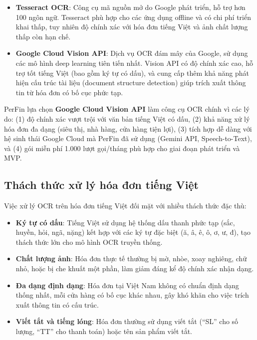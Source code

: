 \begin{itemize}
    \item \textbf{Tesseract OCR}: Công cụ mã nguồn mở do Google phát triển, hỗ trợ hơn 100 ngôn ngữ. Tesseract phù hợp cho các ứng dụng offline và có chi phí triển khai thấp, tuy nhiên độ chính xác với hóa đơn tiếng Việt và ảnh chất lượng thấp còn hạn chế.

    \item \textbf{Google Cloud Vision API}: Dịch vụ OCR đám mây của Google, sử dụng các mô hình deep learning tiên tiến nhất. Vision API có độ chính xác cao, hỗ trợ tốt tiếng Việt (bao gồm ký tự có dấu), và cung cấp thêm khả năng phát hiện cấu trúc tài liệu (document structure detection) giúp trích xuất thông tin từ hóa đơn có bố cục phức tạp.
\end{itemize}

PerFin lựa chọn \textbf{Google Cloud Vision API} làm công cụ OCR chính vì các lý do: (1) độ chính xác vượt trội với văn bản tiếng Việt có dấu, (2) khả năng xử lý hóa đơn đa dạng (siêu thị, nhà hàng, cửa hàng tiện lợi), (3) tích hợp dễ dàng với hệ sinh thái Google Cloud mà PerFin đã sử dụng (Gemini API, Speech-to-Text), và (4) gói miễn phí 1.000 lượt gọi/tháng phù hợp cho giai đoạn phát triển và MVP.

\subsection{Thách thức xử lý hóa đơn tiếng Việt}
\label{subsec:ocr_vietnamese_challenges}

Việc xử lý OCR trên hóa đơn tiếng Việt đối mặt với nhiều thách thức đặc thù:

\begin{itemize}
    \item \textbf{Ký tự có dấu}: Tiếng Việt sử dụng hệ thống dấu thanh phức tạp (sắc, huyền, hỏi, ngã, nặng) kết hợp với các ký tự đặc biệt (ă, â, ê, ô, ơ, ư, đ), tạo thách thức lớn cho mô hình OCR truyền thống.
    \item \textbf{Chất lượng ảnh}: Hóa đơn thực tế thường bị mờ, nhòe, xoay nghiêng, chữ nhỏ, hoặc bị che khuất một phần, làm giảm đáng kể độ chính xác nhận dạng.
    \item \textbf{Đa dạng định dạng}: Hóa đơn tại Việt Nam không có chuẩn định dạng thống nhất, mỗi cửa hàng có bố cục khác nhau, gây khó khăn cho việc trích xuất thông tin có cấu trúc.
    \item \textbf{Viết tắt và tiếng lóng}: Hóa đơn thường sử dụng viết tắt (``SL'' cho số lượng, ``TT'' cho thanh toán) hoặc tên sản phẩm viết tắt.
\end{itemize}

